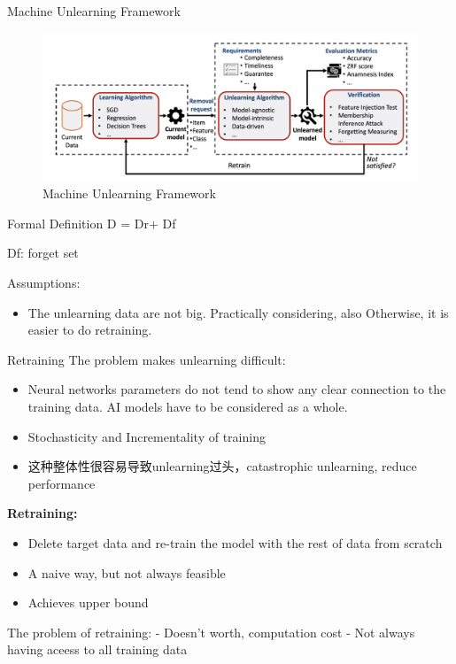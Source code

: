 \documentclass[
  ignorenonframetext,
  aspectratio=169,
]{beamer}
\providecommand{\tightlist}{%
  \setlength{\itemsep}{0pt}\setlength{\parskip}{0pt}}\usepackage{longtable,booktabs,array}
\begin{document}
\begin{frame}{Machine Unlearning Framework}
\label{machine-unlearning-framework}
\begin{figure}[H]

{\centering \includegraphics{assets/machine-unlearning-framework.png}

}

\caption{Machine Unlearning Framework}

\end{figure}%
\end{frame}

\begin{frame}{Formal Definition}
\label{formal-definition}
D = Dr+ Df

Df: forget set

Assumptions:

\begin{itemize}
\tightlist
\item
  The unlearning data are not big. Practically considering, also
  Otherwise, it is easier to do retraining.
\end{itemize}
\end{frame}

\begin{frame}{Retraining}
\label{retraining}
The problem makes unlearning difficult:

\begin{itemize}
\tightlist
\item
  Neural networks parameters do not tend to show any clear connection to
  the training data. AI models have to be considered as a whole.
\item
  Stochasticity and Incrementality of training
\item
  这种整体性很容易导致unlearning过头，catastrophic unlearning, reduce
  performance
\end{itemize}

\textbf{Retraining:}

\begin{itemize}
\tightlist
\item
  Delete target data and re-train the model with the rest of data from
  scratch
\item
  A naive way, but not always feasible
\item
  Achieves upper bound
\end{itemize}

The problem of retraining: - Doesn't worth, computation cost - Not
always having aceess to all training data
\end{frame}
\end{document}
